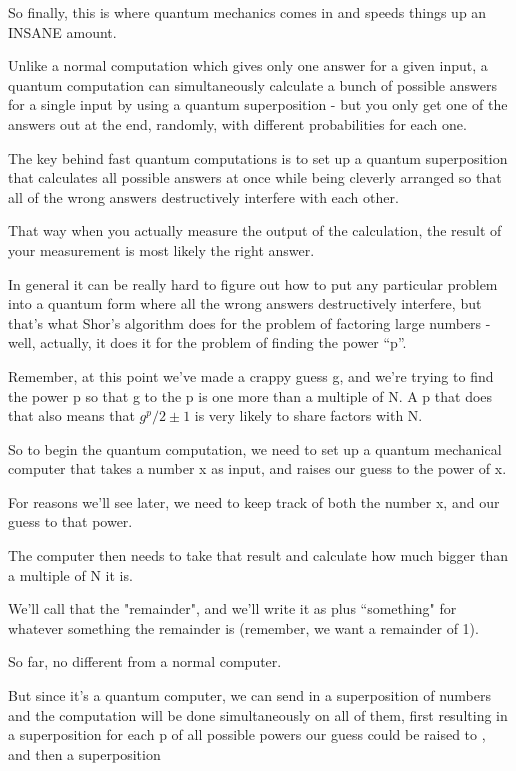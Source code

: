 \documentclass[../main.tex]{subfiles}
\begin{document}
So finally, this is where quantum mechanics comes in and speeds things up an INSANE amount.

Unlike a normal computation which gives only one answer for a given input, a quantum computation can simultaneously calculate a bunch of possible answers for a single input by using a quantum superposition - but you only get one of the answers out at the end, randomly, with different probabilities for each one.

The key behind fast quantum computations is to set up a quantum superposition that calculates all possible answers at once while being cleverly arranged so that all of the wrong answers destructively interfere with each other.

That way when you actually measure the output of the calculation, the result of your measurement is most likely the right answer.

In general it can be really hard to figure out how to put any particular problem into a quantum form where all the wrong answers destructively interfere, but that’s what Shor’s algorithm does for the problem of factoring large numbers - well, actually, it does it for the problem of finding the power “p”.

Remember, at this point we've made a crappy guess g, and we're trying to find the power p so that g to the p is one more than a multiple of N. A p that does that also means that $g^p/2 ±1$ is very likely to share factors with N.

So to begin the quantum computation, we need to set up a quantum mechanical computer that takes a number x as input, and raises our guess to the power of x.

For reasons we'll see later, we need to keep track of both the number x, and our guess to that power.

The computer then needs to take that result and calculate how much bigger than a multiple of N it is.

We'll call that the "remainder", and we'll write it as plus “something" for whatever something the remainder is (remember, we want a remainder of 1).

So far, no different from a normal computer.

But since it’s a quantum computer, we can send in a superposition of numbers and the computation will be done simultaneously on all of them, first resulting in a superposition for each p of all possible powers our guess could be raised to , and then a superposition
\end{document}
